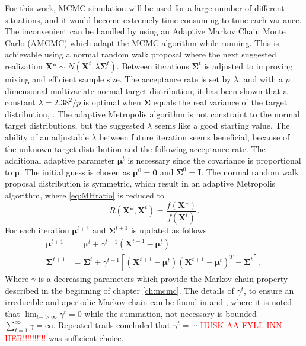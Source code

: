 For this work, MCMC simulation will be used for a large number of different situations, and it would become extremely time-consuming to tune each variance. 
The inconvenient can be handled by using an Adaptive Markov Chain Monte Carlo (AMCMC) which adapt the MCMC algorithm while running. This is achievable using a normal random walk proposal where the next suggested realization $ \boldsymbol{X}\mbox{*} \sim N ( \boldsymbol{X}^{t}, \lambda \boldsymbol{\Sigma}^{t})$. 
Between iterations $\boldsymbol{\Sigma}^t$ is adjusted to improving mixing and efficient sample size. The acceptance rate is set by $\lambda$, and with a $p$ dimensional multivariate normal target distribution, it has been shown that a constant $\lambda=2.38^2/p$ is optimal when $\boldsymbol{\Sigma}$ equals the real variance of the target distribution, \cite{AccRate}. The adaptive Metropolis algorithm is not constraint to the normal target distributions, but the suggested $\lambda$ seems like a good starting value. The ability of an adjustable $\lambda$ between future iteration seems beneficial, because of the unknown target distribution and the following acceptance rate.
The additional adaptive parameter $\boldsymbol{\mu}^t$ is necessary since the covariance is proportional to $\boldsymbol{\mu}$. The initial guess is chosen as $\boldsymbol{\mu}^0=\boldsymbol{0}$ and $\boldsymbol{\Sigma}^0=\mathbf{I}$.
The normal random walk proposal distribution is symmetric, which result in an adaptive Metropolis algorithm, where \eqref{eq:MHratio} is reduced to
\begin{equation}
\label{eq:metropolis}
R(\boldsymbol{X} \mbox{*},\boldsymbol{X}^{t})=\frac{f(\boldsymbol{X} \mbox{*})}{f(\boldsymbol{X}^{t})}.
\end{equation}
For each iteration $\boldsymbol{\mu}^{t+1}$ and $\boldsymbol{\Sigma}^{t+1}$ is updated as follows
\begin{align}
\boldsymbol{\mu}^{t+1}&=\boldsymbol{\mu}^{t}+\gamma^{t+1}(\boldsymbol{X}^{t+1}-\boldsymbol{\mu}^t)\\
\boldsymbol{\Sigma}^{t+1}&=\boldsymbol{\Sigma}^{t}+\gamma^{t+1}\left[(\boldsymbol{X}^{t+1}-\boldsymbol{\mu}^t)(\boldsymbol{X}^{t+1}-\boldsymbol{\mu}^t)^{T}-\boldsymbol{\Sigma}^{t}\right],
\end{align}
Where $\gamma$ is a decreasing parameters which provide the Markov chain property described in the beginning of chapter \ref{ch:mcmc}. The details of $\gamma^t$, to ensure an irreducible and aperiodic Markov chain can be found in \cite{compstat550} 
and \cite{compstat16}
, where it is noted that $\lim_{t->\infty} \gamma^{t}=0$ while the summation, not necessary is bounded $ \sum_{t=1}^{\infty} \gamma=\infty $. 
Repeated trails concluded that $\gamma^t=\cdots$ \textcolor{red}{HUSK AA FYLL INN HER!!!!!!!!!!} was sufficient choice. %

